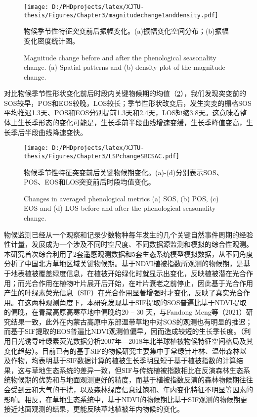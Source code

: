 \begin{figure}[h]
  \centering
  \texttt{[image: D:/PHDprojects/latex/XJTU-thesis/Figures/Chapter3/magnitudechange1anddensity.pdf]}
  \caption{物候季节性特征突变前后振幅变化。(a)振幅变化空间分布；(b)振幅变化密度统计图。}
  \addtocounter{figure}{-1}
  \vspace{5pt}
  \renewcommand{\figurename}{Fig}
  \caption{Magnitude change before and after the phenological seasonality change. (a) Spatial patterns and (b) density plot of the magnitude change.}
  \label{figure48}
\end{figure}

对比物候季节性形状变化前后时段内关键物候期的均值（\cref{figure49}），我们发现突变前的SOS较早，POS和EOS较晚，LOS较长；季节性形状改变后，发生突变的栅格SOS平均推迟1.3天、POS和EOS分别提前1.3天和2.4天，LOS短缩3.8天。这意味着整体上生长季形态的变化可能是，生长季前半段曲线增速变缓，生长季峰值变高，生长季后半段曲线降速变快。

\begin{figure}[h]
  \centering
  \texttt{[image: D:/PHDprojects/latex/XJTU-thesis/Figures/Chapter3/LSPchangeSBCSAC.pdf]}
  \caption{物候季节性特征突变前后关键物候期变化。(a)-(d)分别表示SOS、POS、EOS和LOS突变前后时段均值变化。}
  \addtocounter{figure}{-1}
  \vspace{5pt}
  \renewcommand{\figurename}{Fig}
  \caption{Changes in averaged phenological metrics (a) SOS, (b) POS, (c) EOS and (d) LOS before and after the phenological seasonality change.}
  \label{figure49}
\end{figure}



物候监测已经从一个观察和记录少数物种每年发生的几个关键自然事件周期的经验性计量，发展成为一个涉及不同时空尺度、不同数据源监测和模拟的综合性观测。本研究首次综合利用了2套遥感观测数据和5套生态系统模型模拟数据，从不同角度分析了中国北方草地区域关键物候期。基于NDVI植被指数所观测的物候期，是基于地表植被覆盖绿度信息，在植被开始绿化时就显示出变化，反映植被潜在光合作用；而光合作用在植物叶片展开后开始，在叶片衰老之前停止，因此基于光合作用产生的叶绿素荧光信息（SIF）在光合作用显著增强时才变化，反映了真实光合作用。在这两种观测角度下，本研究发现基于SIF提取的SOS普遍比基于NDVI提取的偏晚，在青藏高原高寒草地中偏晚约20 – 30 天，与Fandong Meng等（2021）研究结果一致，此外在内蒙古高原中东部温带草地中对SOS的观测也有明显的推迟；而基于SIF提取的EOS普遍比NDVI观测值偏早，因而造成较短的生长季长度。（利用日光诱导叶绿素荧光数据分析2007年—2018年北半球植被物候特征空间格局及其变化趋势）。目前已有的基于SIF的物候研究主要集中于常绿针叶林、温带森林以及作物，均表明基于SIF数据计算的植被生长季明显短于基于植被指数的计算结果，这与草地生态系统的差异一致，但SIF与传统植被指数相比在反演森林生态系统物候期的优势和与地面观测更好的精度，而基于植被指数反演的森林物候期往往会受到云和大气的干扰，以及森林绿度信息过饱和、年内变化特征不明显等因素的影响。相反，在草地生态系统中，基于NDVI的物候期比基于SIF观测的物候期更接近地面观测的结果，更能反映草地植被年内物候的变化。

